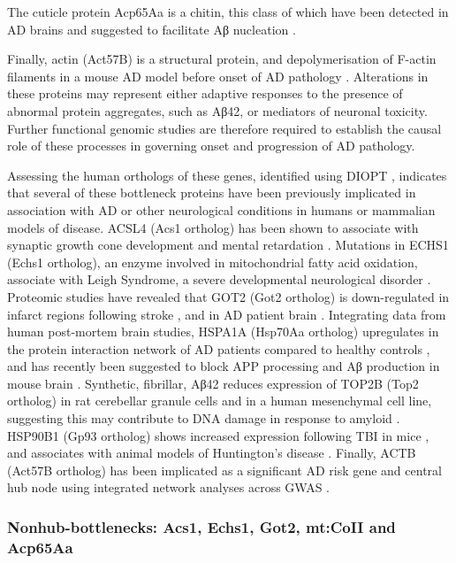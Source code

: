 The cuticle protein Acp65Aa is a chitin,
this class of which have been detected in AD brains and suggested to facilitate Aβ
nucleation \cite{Castellani2005}.

Finally, actin (Act57B) is a structural protein, and depolymerisation of F-actin
filaments in a mouse AD model before onset of AD pathology \cite{Kommaddi2018}.
Alterations in these proteins may represent either adaptive responses to the presence
of abnormal protein aggregates, such as Aβ42, or mediators of neuronal toxicity.
Further functional genomic studies are therefore required to establish the causal role
of these processes in governing onset and progression of AD pathology.

Assessing the human orthologs of these genes, identified using DIOPT \cite{Hu2011a},
indicates that several of these bottleneck proteins have been previously implicated
in association with AD or other neurological conditions in humans
or mammalian models of disease.
ACSL4 (Acs1 ortholog) has been shown to associate with synaptic growth cone development
and mental retardation \cite{Meloni2002}.
Mutations in ECHS1 (Echs1 ortholog), an enzyme involved in mitochondrial fatty acid oxidation,
associate with Leigh Syndrome, a severe developmental neurological disorder \cite{Peters2014}.
Proteomic studies have revealed that GOT2 (Got2 ortholog) is down-regulated
in infarct regions following stroke \cite{Datta2013},
and in AD patient brain \cite{McKenzie2017}.
Integrating data from human post-mortem brain studies,
HSPA1A (Hsp70Aa ortholog) upregulates in the protein interaction network of AD patients
compared to healthy controls \cite{Chi2016},
and has recently been suggested to block APP processing
and Aβ production in mouse brain \cite{Gerber2019}.
Synthetic, fibrillar, Aβ42 reduces expression of TOP2B (Top2 ortholog)
in rat cerebellar granule cells and in a human mesenchymal cell line,
suggesting this may contribute to DNA damage in response to amyloid \cite{Terzioglu-Usak2017}.
HSP90B1 (Gp93 ortholog) shows increased expression following TBI in mice \cite{Tzekov2016},
and associates with animal models of Huntington’s disease \cite{MatthiasE2015}.
Finally, ACTB (Act57B ortholog) has been implicated as a significant AD risk gene
and central hub node using integrated network analyses across GWAS \cite{Talwar2014}.

\subsubsection{Nonhub-bottlenecks: Acs1, Echs1, Got2, mt:CoII and Acp65Aa}

